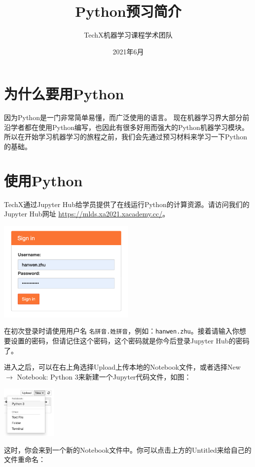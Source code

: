 \documentclass{article}
\title{Python预习简介}
\author{TechX机器学习课程学术团队}
\date{2021年6月}
\begin{document}
\maketitle

\section{为什么要用Python}
因为Python是一门非常简单易懂，而广泛使用的语言。
现在机器学习界大部分前沿学者都在使用Python编写，也因此有很多好用而强大的Python机器学习模块。
所以在开始学习机器学习的旅程之前，我们会先通过预习材料来学习一下Python的基础。

\section{使用Python}
TechX通过Jupyter Hub给学员提供了在线运行Python的计算资源。请访问我们的Jupyter Hub网址 \url{https://mlds.xa2021.xacademy.cc/}。

\vspace*{0.3cm}\centerline{\noindent\includegraphics[width=0.5\textwidth]{hub-signin.png}}

在初次登录时请使用用户名 \texttt{名拼音.\hspace*{0cm}姓拼音}，例如：\texttt{hanwen.zhu}。接着请输入你想要设置的密码，但请记住这个密码，这个密码就是你今后登录Jupyter Hub的密码了。

进入之后，可以在右上角选择Upload上传本地的Notebook文件，或者选择New $\rightarrow$ Notebook: Python 3来新建一个Jupyter代码文件，如图：

\vspace*{0.3cm}\centerline{\noindent\includegraphics[width=0.2\textwidth]{new-ipynb.png}}

这时，你会来到一个新的Notebook文件中。你可以点击上方的Untitled来给自己的文件重命名：
\end{document}
